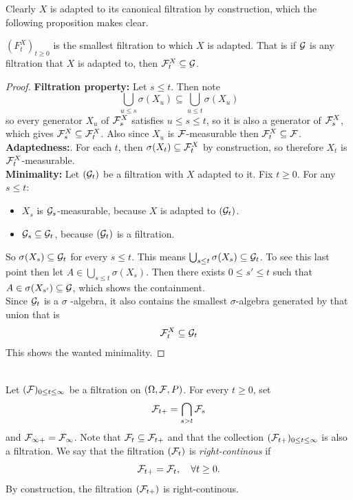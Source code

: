 Clearly $X$ is adapted to its canonical filtration by construction, which the following proposition makes clear.
\begin{proposition}\label{chap3.1:proposition-canonical_filtration_is_smallest_filtration_for_adaptness}
$(F^X_t)_{t \geq 0}$ is the smallest filtration to which $X$ is adapted. That is if $\mathcal{G}$ is any filtration that $X$ is adapted to, then $\mathcal{F}_t^X \subseteq \mathcal{G}$.
\end{proposition}
\begin{proof}
\textbf{Filtration property:} Let $s \leq t$. Then note
$$\bigcup_{u\leq s}\sigma(X_u) \subseteq\bigcup_{u \leq t} \sigma(X_u)$$
so every generator $X_u$ of $\mathcal{F}_s^X$ satisfies $u \leq s \leq t$, so it is also a generator of $\mathcal{F}_s^X$, which gives $\mathcal{F}_s^X \subseteq \mathcal{F}_t^X$. Also since $X_u$ is $\mathcal{F}$-measurable then $\mathcal{F}_t^X \subseteq \mathcal{F}$.\\
\textbf{Adaptedness:}. For each $t$, then $\sigma(X_t) \subseteq\mathcal{F}_t^X$ by construction, so therefore $X_t$ is $\mathcal{F}_t^X$-measurable.\\
\textbf{Minimality:} Let $(\mathcal{G}_t)$ be a filtration with $X$ adapted to it. Fix $t \geq 0$. For any $s \leq t$:
\begin{itemize}
    \item $X_s$ is $\mathcal{G}_s$-measurable, because $X$ is adapted to $(\mathcal{G}_t)$.
    \item $\mathcal{G}_s \subseteq \mathcal{G}_t$, because $(\mathcal{G}_t)$ is a filtration.
\end{itemize}
So $\sigma(X_s) \subseteq \mathcal{G}_t$ for every $s \leq t$. This means $\bigcup_{s \leq t}\sigma(X_s) \subseteq \mathcal{G}_t$. To see this last point then let $A \in \bigcup_{s \leq t}\sigma(X_s)$. Then there exists $0 \leq s' \leq t$ such that $A \in \sigma(X_{s'}) \subseteq\mathcal{G}$, which shows the containment.\\
Since $\mathcal{G}_t$ is a $\sigma$
-algebra, it also contains the smallest $\sigma$-algebra generated by that union that is
$$\mathcal{F}_t^X \subseteq \mathcal{G}_t$$
This shows the wanted minimality.
\end{proof}

\begin{definition}\label{chap3.1:definition-right_cont_filtration} 
 \\
Let $(\mathcal{F})_{0 \leq t \leq \infty}$ be a filtration on $(\Omega, \mathcal{F}, P)$. For every $t \geq 0$, set
$$\mathcal{F}_{t+}=\bigcap_{s>t}\mathcal{F}_s$$
and $\mathcal{F}_{\infty+}=\mathcal{F}_\infty$. Note that $\mathcal{F}_t \subseteq \mathcal{F}_{t+}$ and that the collection $(\mathcal{F}_{t+})_{0 \leq t \leq \infty}$ is also a filtration. We say that the filtration $(\mathcal{F}_t)$ is \textit{right-continous} if
$$\mathcal{F}_{t+}=\mathcal{F}_t, \quad \forall t \geq 0.$$
By construction, the filtration $(\mathcal{F}_{t+})$ is right-continous.
\end{definition}

